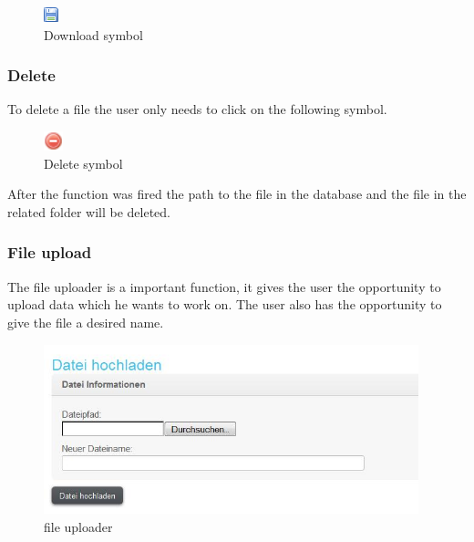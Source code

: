 \begin{figure}[!ht]
  \centering
    \includegraphics{images/disk.png}
  \caption{Download symbol}
  \label{fig:download symbol}
\end{figure}

\subsubsection{Delete}

To delete a file the user only needs to click on the following symbol.

\begin{figure}[!ht]
  \centering
    \includegraphics[width=0.05\textwidth]{images/delete.png}
  \caption{Delete symbol}
  \label{fig:delete symbol}
\end{figure}

After the function was fired the path to the file in the database and the file in the related folder will be deleted.

\subsubsection{File upload}

The file uploader is a important function, it gives the user the opportunity to upload data which he wants to work on. The user also has the opportunity to give the file a desired name.

\begin{figure}[!ht]
  \centering
    \includegraphics[width=0.97\textwidth]{images/basic_functionalities/datei_hochladen.jpg}
  \caption{file uploader}
  \label{fig:file uploader}
\end{figure}

